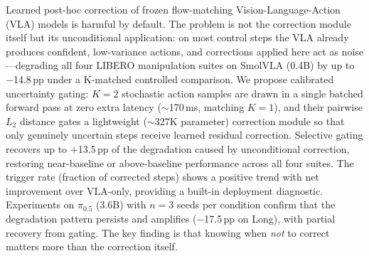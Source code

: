 Learned post-hoc correction of frozen flow-matching Vision-Language-Action (VLA) models is harmful by default. The problem is not the correction module itself but its unconditional application: on most control steps the VLA already produces confident, low-variance actions, and corrections applied here act as noise---degrading all four LIBERO manipulation suites on SmolVLA (0.4B) by up to $-$14.8\,pp under a K-matched controlled comparison. We propose calibrated uncertainty gating: $K{=}2$ stochastic action samples are drawn in a single batched forward pass at zero extra latency (${\sim}$170\,ms, matching $K{=}1$), and their pairwise $L_2$ distance gates a lightweight (${\sim}$327K parameter) correction module so that only genuinely uncertain steps receive learned residual correction. Selective gating recovers up to $+$13.5\,pp of the degradation caused by unconditional correction, restoring near-baseline or above-baseline performance across all four suites. The trigger rate (fraction of corrected steps) shows a positive trend with net improvement over VLA-only, providing a built-in deployment diagnostic. Experiments on $\pi_{0.5}$ (3.6B) with $n{=}3$ seeds per condition confirm that the degradation pattern persists and amplifies ($-$17.5\,pp on Long), with partial recovery from gating. The key finding is that knowing when \emph{not} to correct matters more than the correction itself.
